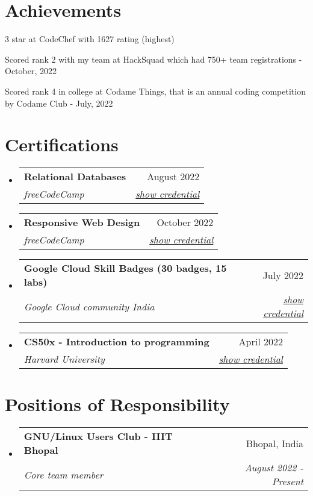 \documentclass[a4paper,20pt]{article}
\makeatletter
\newcommand{\resumeSubheading}[4]{
  \vspace{-1pt}\item
    \begin{tabular*}{0.97\textwidth}{l@{\extracolsep{\fill}}r}
      \textbf{#1} & #2 \\
      \textit{#3} & \textit{#4} \\
    \end{tabular*}\vspace{-5pt}
}
\newcommand{\resumeSubHeadingListStart}{\begin{itemize}[leftmargin=*]}
\newcommand{\resumeSubHeadingListEnd}{\end{itemize}}
\makeatother
\begin{document}
\vspace{-5pt}
\section{Achievements}
\begin{description}[font=$\bullet$]
    \item {3 star at CodeChef with 1627 rating (highest)}
    \vspace{-5pt}
    \item {Scored rank 2 with my team at HackSquad which had 750+ team registrations - October, 2022}
    \vspace{-5pt}
    \item {Scored rank 4 in college at Codame Things, that is an annual coding competition by Codame Club - July, 2022}
\end{description}
\vspace{-5pt}
\section{Certifications}
\resumeSubHeadingListStart
    \resumeSubheading
    {Relational Databases}{August 2022}
    {freeCodeCamp}{\href{https://www.freecodecamp.org/certification/satyamrs00/relational-database-v8}{show credential}}

    \resumeSubheading
    {Responsive Web Design}{October 2022}
    {freeCodeCamp}{\href{https://www.freecodecamp.org/certification/satyamrs00/responsive-web-design}{show credential}}
    
    \resumeSubheading
    {Google Cloud Skill Badges (30 badges, 15 labs)}{July 2022}
    {Google Cloud community India} {\href{https://www.cloudskillsboost.google/public_profiles/979efb3e-91bc-476f-ba38-d35c4879a1fa}{show credential}}

    \resumeSubheading
    {CS50x - Introduction to programming}{April 2022}
    {Harvard University}{\href{https://certificates.cs50.io/5a9d3a4b-57f0-4d46-95fa-222159e1368f.pdf?size=letter}{show credential}}
    
\resumeSubHeadingListEnd

\vspace{-5pt}
\section{Positions of Responsibility}
\resumeSubHeadingListStart
    \resumeSubheading
    {GNU/Linux Users Club - IIIT Bhopal}{Bhopal, India}
    {Core team member}{August 2022 - Present}
\resumeSubHeadingListEnd
\end{document}
